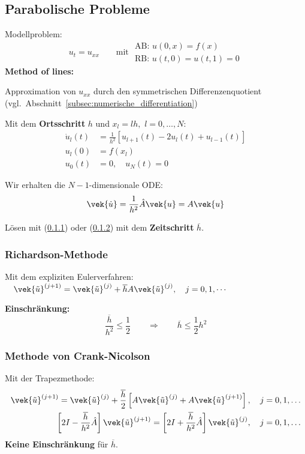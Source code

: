 	\subsection{Parabolische Probleme}
		Modellproblem:
		\[
			u_t = u_{xx} \qquad \text{mit } \begin{array}{l}
				\text{AB: } u(0,x)=f(x) \\
				\text{RB: } u(t,0) = u(t,1)=0
			\end{array}
		\]
		\textbf{Method of lines:} 
		\begin{tightenumerate}
			\item Approximation von $u_{xx}$ durch den symmetrischen Differenzenquotient (vgl.~Abschnitt~\ref{subsec:numerische_differentiation}) 
			\item Mit dem \textbf{Ortsschritt} $h$ und $x_l = lh,$ $l=0,\dots, N$:
				\begin{align*}
					\dot u_l(t) &= \frac{1}{h^2}\left[ u_{l+1}(t) - 2u_l(t) + u_{l-1}(t)\right] \\
					u_l(0) &= f(x_l) \\
					u_0(t) &= 0,\quad u_N(t) = 0
				\end{align*}
			\item Wir erhalten die $N-1$-dimensionale ODE:
				\[
					\vek{\dot u} = \frac{1}{h^2} \hat A \vek{u} = A \vek{u}
				\]
			\item Lösen mit (\ref{richardson}) oder (\ref{crank}) mit dem \textbf{Zeitschritt} $\overline{h}$. 
		\end{tightenumerate}
		
		\subsubsection{Richardson-Methode}
			\label{richardson}
			Mit dem expliziten Eulerverfahren: $\quad \vek{\tilde u}^{(j+1)}= \vek{\tilde u}^{(j)} + \overline{h}A\vek{\tilde u}^{(j)}, \quad j=0,1,\cdots$
			
			\textbf{Einschränkung:}
			\[
				\frac{\overline{h}}{h^2} \leq \frac{1}{2} \qquad \Rightarrow\qquad \overline{h}\leq \frac{1}{2} h^2
			\]
			
		\subsubsection{Methode von Crank-Nicolson}
			\label{crank}
			Mit der Trapezmethode:
			\begin{align*}
				\vek{\tilde u}^{(j+1)} = \vek{\tilde u}^{(j)} + \frac{\overline{h}}{2}\left[A\vek{\tilde u}^{(j)} + A\vek{\tilde u}^{(j+1)}\right], \quad j=0,1,\dots \\
				\left[ 2I - \frac{\overline{h}}{h^2}\hat A\right]\vek{\tilde u}^{(j+1)} = \left[ 2I + \frac{\overline{h}}{h^2}\hat A\right]\vek{\tilde u}^{(j)}, \quad j=0,1,\dots
			\end{align*}
			\textbf{Keine Einschränkung} für $\overline{h}$. 
			
